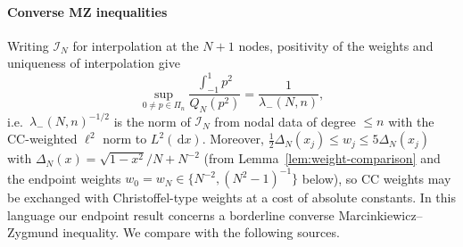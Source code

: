 \documentclass{siamart251216}
\newcommand{\Pn}{\Pi}
\newcommand{\dd}{\,\mathrm d}
\begin{document}
\paragraph{Converse MZ inequalities}
Writing $\mathcal I_N$ for interpolation at the $N+1$ nodes, positivity of
the weights and uniqueness of interpolation give
\[
 \sup_{0\ne p\in\Pn_n}\frac{\int_{-1}^1p^2}{Q_N(p^2)}=\frac1{\lambda_-(N,n)},
\]
i.e.\ $\lambda_-(N,n)^{-1/2}$ is the norm of $\mathcal I_N$ from nodal data of
degree $\le n$ with the CC-weighted $\ell^2$ norm to $L^2(\dd x)$.
Moreover, $\tfrac12\Delta_N(x_j)\le w_j\le5\Delta_N(x_j)$ with
$\Delta_N(x)=\sqrt{1-x^2}/N+N^{-2}$ (from Lemma~\ref{lem:weight-comparison} and the endpoint weights $w_0=w_N\in\{N^{-2},(N^2-1)^{-1}\}$
below), so CC weights may be exchanged with Christoffel-type weights at a
cost of absolute constants. In this language our endpoint result concerns
a borderline converse Marcinkiewicz--Zygmund inequality.
We compare with the following sources.
\end{document}
